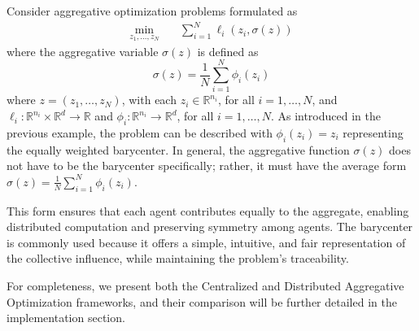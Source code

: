 \noindent Consider aggregative optimization problems formulated as
\begin{align*}
    \min_{z_1, \dots, z_N} \quad & \sum_{i=1}^N \ell_i(z_i, \sigma(z))
\end{align*}
where the aggregative variable \(\sigma(z)\) is defined as
\[
    \sigma(z) = \frac{1}{N} \sum_{i=1}^N \phi_i(z_i)
\]
where \( z = (z_1, \ldots, z_N) \), with each \( z_i \in \mathbb{R}^{n_i} \), for all \( i = 1, \ldots, N \), and \( \ell_i : \mathbb{R}^{n_i} \times \mathbb{R}^d \rightarrow \mathbb{R} \) and \( \phi_i : \mathbb{R}^{n_i} \rightarrow \mathbb{R}^d \), for all \( i = 1, \ldots, N \).
As introduced in the previous example, the problem can be described with $\phi_i(z_i)=z_i$ representing the equally weighted barycenter.
\noindent In general, the aggregative function \(\sigma(z)\) does not have to be the barycenter specifically; rather, it must have the average form $\sigma(z) = \frac{1}{N} \sum_{i=1}^N \phi_i(z_i)$.

This form ensures that each agent contributes equally to the aggregate, enabling distributed computation and preserving symmetry among agents. The barycenter is commonly used because it offers a simple, intuitive, and fair representation of the collective influence, while maintaining the problem's traceability.

\medskip
\noindent For completeness, we present both the Centralized and Distributed Aggregative Optimization frameworks, and their comparison will be further detailed in the implementation section. \\


